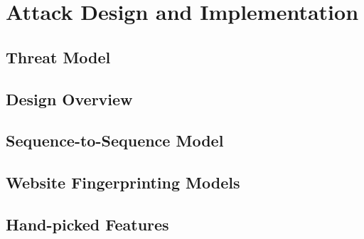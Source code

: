 \section{Attack Design and Implementation}

\subsection{Threat Model}

\subsection{Design Overview}

\subsection{Sequence-to-Sequence Model}

\subsection{Website Fingerprinting Models}


\subsection{Hand-picked Features}
